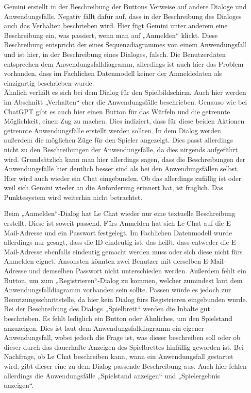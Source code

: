 Gemini erstellt in der Beschreibung der Buttons Verweise auf andere Dialoge und Anwendungsfälle. Negativ fällt dafür auf, dass in der 
Beschreibung des Dialoges auch das Verhalten beschrieben wird. Hier fügt Gemini unter anderem eine Beschreibung ein, was passiert, wenn man 
auf „Anmelden“ klickt. Diese Beschreibung entspricht der eines Sequenzdiagrammes von einem Anwendungsfall und ist hier, in der Beschreibung 
eines Dialoges, falsch. Die Benutzerdaten entsprechen dem Anwendungsfalldiagramm, allerdings ist auch hier das Problem vorhanden, dass im 
Fachlichen Datenmodell keiner der Anmeldedaten als einzigartig beschrieben wurde.\\
Ähnlich verhält es sich bei dem Dialog für den Spielbildschirm. Auch hier werden im Abschnitt „Verhalten“ eher die Anwendungsfälle beschrieben. 
Genauso wie bei ChatGPT gibt es auch hier einen Button für das Würfeln und die getrennte Möglichkeit, einen Zug zu machen. Dies indiziert, dass 
für diese beiden Aktionen getrennte Anwendungsfälle erstellt werden sollten. In dem Dialog werden außerdem die möglichen Züge für den Spieler 
angezeigt. Dies passt allerdings nicht zu den Beschreibungen der Anwendungsfälle, da dies nirgends aufgeführt wird. Grundsätzlich kann man hier 
allerdings sagen, dass die Beschreibungen der Anwendungsfälle hier deutlich besser sind als bei den Anwendungsfällen selbst. Hier wird auch 
wieder ein Chat eingebunden. Ob das allerdings zufällig ist oder weil sich Gemini wieder an die Anforderung erinnert hat, ist fraglich. Das 
Punktesystem wird weiterhin nicht betrachtet.

Beim „Anmelden“-Dialog hat Le Chat wieder nur eine textuelle Beschreibung erstellt. Diese ist soweit passend. Fürs Anmelden hat sich Le Chat 
auf die E-Mail-Adresse und ein Passwort festgelegt. Im Fachlichen Datenmodell wurde allerdings nur gesagt, dass die ID eindeutig ist, das 
heißt, dass entweder die E-Mail-Adresse ebenfalls eindeutig gemacht werden muss oder sich diese nicht fürs Anmelden eignet. Ansonsten könnten 
zwei Benutzer mit derselben E-Mail-Adresse und demselben Passwort nicht unterschieden werden. Außerdem fehlt ein Button, um zum 
„Registrieren“-Dialog zu kommen, welcher zumindest laut dem Anwendungsfalldiagramm vorhanden sein sollte. Passen würde es jedoch zur 
Benutzungsschnittstelle, da hier kein Dialog fürs Registrieren eingebunden wurde.\\
Bei der Beschreibung des Dialogs „Spielbrett“ werden die Inhalte gut beschrieben. Es fehlt lediglich ein Button oder Ähnliches, um den 
Spielstand anzuzeigen. Dies ist laut dem Anwendungsfalldiagramm ein eigener Anwendungsfall, wobei jedoch die Frage ist, was dieser beschreiben 
soll oder ob dieser durch das dauerhafte Anzeigen des Spielbrettes hinfällig geworden ist. Bei Nachfrage, ob Le Chat beschreiben kann, wann 
ein Anwendungsfall gestartet wird, gibt dieser eine zu dem Dialog passende Beschreibung aus. Auch hier fehlen allerdings die Anwendungsfälle 
„Spielstand anzeigen“ und „Spielergebnis anzeigen“.

